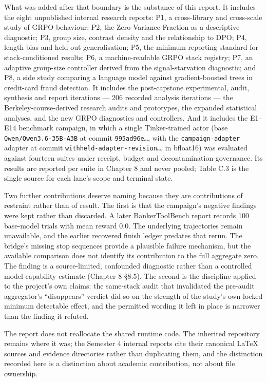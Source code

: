 \documentclass[12pt,a4paper]{report}
\begin{document}
What was added after that boundary is the substance of this report. It
includes the eight unpublished internal research reports: P1, a
cross-library and cross-scale study of GRPO behaviour; P2, the
Zero-Variance Fraction as a descriptive diagnostic; P3, group size,
contrast density and the relationship to DPO; P4, length bias and
held-out generalisation; P5, the minimum reporting standard for
stack-conditioned results; P6, a machine-readable GRPO stack registry;
P7, an adaptive group-size controller derived from the signal-starvation
diagnostic; and P8, a side study comparing a language model against
gradient-boosted trees in credit-card fraud detection. It includes the
post-capstone experimental, audit, synthesis and report iterations ---
206 recorded analysis iterations --- the Berkeley-course-derived
research audits and prototypes, the expanded statistical analyses, and
the new GRPO diagnostics and controllers. And it includes the E1--E14
benchmark campaign, in which a single Tinker-trained actor (base
\texttt{Qwen/Qwen3.6-35B-A3B} at commit \texttt{995ad96e…}, with the
\texttt{campaign-adapter} adapter at commit
\texttt{withheld-adapter-revision…}, in bfloat16) was evaluated against
fourteen suites under receipt, budget and decontamination governance.
Its results are reported per suite in Chapter 8 and never pooled; Table
C.3 is the single source for each lane's scope and terminal state.

Two further contributions deserve naming because they are contributions
of restraint rather than of result. The first is that the campaign's
negative findings were kept rather than discarded. A later
BankerToolBench report records 100 base-model trials with mean reward
0.0. The underlying trajectories remain unavailable, and the earlier
recovered finish ledger predates that rerun. The bridge's missing stop
sequences provide a plausible failure mechanism, but the available
comparison does not identify its contribution to the full aggregate
zero. The finding is a source-limited, confounded diagnostic rather than
a controlled model-capability estimate (Chapter 8 §8.5). The second is
the discipline applied to the project's own claims: the same-stack audit
that invalidated the pre-audit aggregator's ``disappears'' verdict did
so on the strength of the study's own locked minimum detectable effect,
and the permitted wording it left in place is narrower than the finding
it refuted.

The report does not reallocate the shared runtime code. The inherited
repository remains where it was; the Semester 4 internal reports cite
their canonical LaTeX sources and evidence directories rather than
duplicating them, and the distinction recorded here is a distinction
about academic contribution, not about file ownership.
\end{document}
